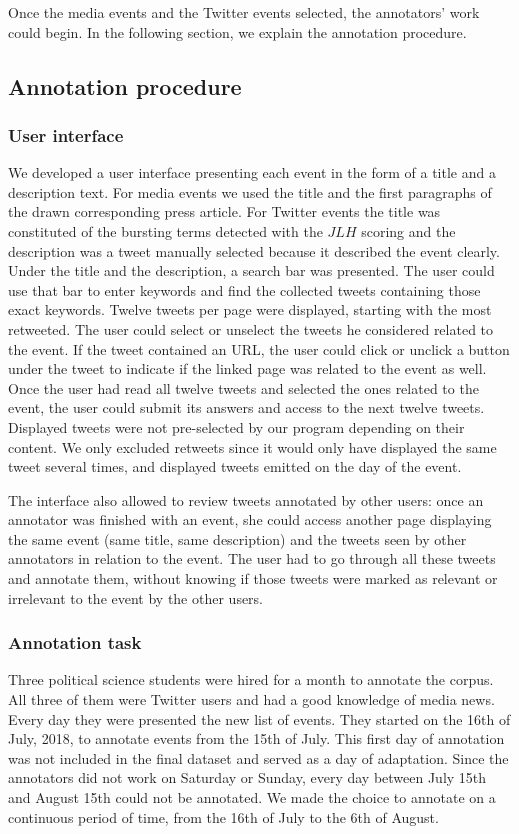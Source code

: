 Once the media events and the Twitter events selected, the annotators' work could begin. In the following section, we explain the annotation procedure.
		\subsection{Annotation procedure}
		\subsubsection{User interface}
We developed a user interface presenting each event in the form of a title and a description text. For media events we used the title and the first paragraphs of the drawn corresponding press article. For Twitter events the title was constituted of the bursting terms detected with the $JLH$ scoring and the description was a tweet manually selected because it described the event clearly. Under the title and the description, a search bar was presented. The user could use that bar to enter keywords and find the collected tweets containing those exact keywords. Twelve tweets per page were displayed, starting with the most retweeted. The user could select or unselect the tweets he considered related to the event. If the tweet contained an URL, the user could click or unclick a button under the tweet to indicate if the linked page was related to the event as well. Once the user had read all twelve tweets and selected the ones related to the event, the user could submit its answers and access to the next twelve tweets. Displayed tweets were not pre-selected by our program depending on their content. We only excluded retweets since it would only have displayed the same tweet several times, and displayed tweets emitted on the day of the event. 


The interface also allowed to review tweets annotated by other users: once an annotator was finished with an event, she could access another page displaying the same event (same title, same description) and the tweets seen by other annotators in relation to the event. The user had to go through all these tweets and annotate them, without knowing if those tweets were marked as relevant or irrelevant to the event by the other users.

		\subsubsection{Annotation task}
	Three political science students were hired for a month to annotate the corpus. All three of them were Twitter users and had a good knowledge of media news. Every day they were presented the new list of events. They started on the 16th of July, 2018, to annotate events from the 15th of July. This first day of annotation was not included in the final dataset and served as a day of adaptation. Since the annotators did not work on Saturday or Sunday, every day between July 15th and August 15th could not be annotated. We made the choice to annotate on a continuous period of time, from the 16th of July to the 6th of August.


